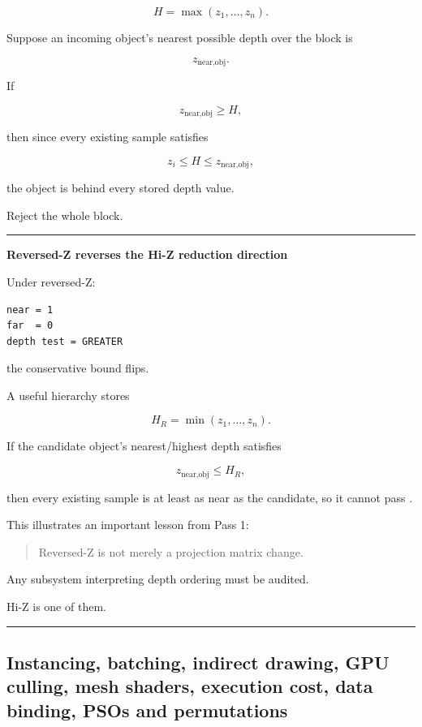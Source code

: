 \[
H=\max(z_1,\dots,z_n).
\]

Suppose an incoming object's nearest possible depth over the block is

\[
z_{\text{near,obj}}.
\]

If

\[
z_{\text{near,obj}}\ge H,
\]

then since every existing sample satisfies

\[
z_i\le H\le z_{\text{near,obj}},
\]

the object is behind every stored depth value.

Reject the whole block.

\begin{center}\rule{0.5\linewidth}{0.5pt}\end{center}

\textbf{Reversed-Z reverses the Hi-Z reduction direction}

Under reversed-Z:

\begin{verbatim}
near = 1
far  = 0
depth test = GREATER
\end{verbatim}

the conservative bound flips.

A useful hierarchy stores

\[
H_R=\min(z_1,\dots,z_n).
\]

If the candidate object's nearest/highest depth satisfies

\[
z_{\text{near,obj}}\le H_R,
\]

then every existing sample is at least as near as the candidate, so it cannot pass .

This illustrates an important lesson from Pass 1:

\begin{quote}
Reversed-Z is not merely a projection matrix change.
\end{quote}

Any subsystem interpreting depth ordering must be audited.

Hi-Z is one of them.

\begin{center}\rule{0.5\linewidth}{0.5pt}\end{center}

\subsection{Instancing, batching, indirect drawing, GPU culling, mesh shaders, execution cost, data binding, PSOs and permutations}\label{03-visual-computing-i-ch014-instancing-batching-indirect-drawing-gpu-culling-mesh-shaders-execution-cost-data-binding-psos-and-permutations}

